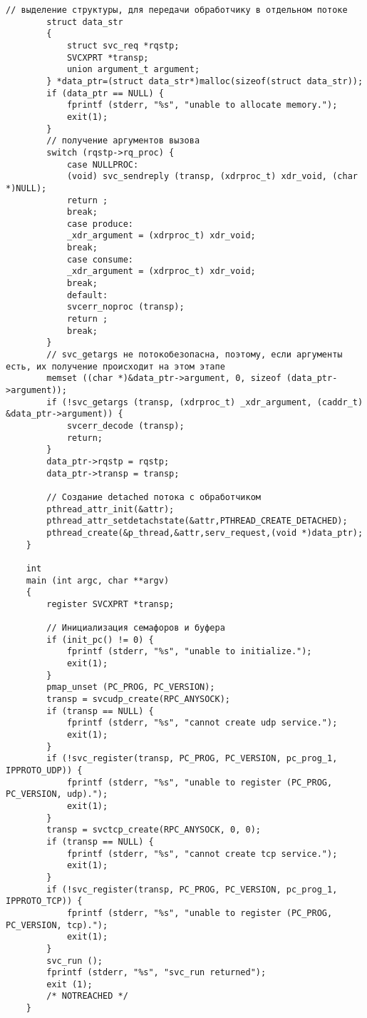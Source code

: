 \begin{lstlisting}[caption={<<Модифицированный файл pc\_svc.c с кодом многопоточного rpc сервер>>}]
		// выделение структуры, для передачи обработчику в отдельном потоке
		struct data_str
		{
			struct svc_req *rqstp;
			SVCXPRT *transp;
			union argument_t argument;
		} *data_ptr=(struct data_str*)malloc(sizeof(struct data_str));
		if (data_ptr == NULL) {
			fprintf (stderr, "%s", "unable to allocate memory.");
			exit(1);
		}
		// получение аргументов вызова
		switch (rqstp->rq_proc) {
			case NULLPROC:
			(void) svc_sendreply (transp, (xdrproc_t) xdr_void, (char *)NULL);
			return ;
			break;
			case produce:
			_xdr_argument = (xdrproc_t) xdr_void;
			break;
			case consume:
			_xdr_argument = (xdrproc_t) xdr_void;
			break;
			default:
			svcerr_noproc (transp);
			return ;
			break;
		}
		// svc_getargs не потокобезопасна, поэтому, если аргументы есть, их получение происходит на этом этапе
		memset ((char *)&data_ptr->argument, 0, sizeof (data_ptr->argument));
		if (!svc_getargs (transp, (xdrproc_t) _xdr_argument, (caddr_t) &data_ptr->argument)) {
			svcerr_decode (transp);
			return;
		}
		data_ptr->rqstp = rqstp;
		data_ptr->transp = transp;
		
		// Создание detached потока с обработчиком
		pthread_attr_init(&attr);
		pthread_attr_setdetachstate(&attr,PTHREAD_CREATE_DETACHED);
		pthread_create(&p_thread,&attr,serv_request,(void *)data_ptr);
	}
	
	int
	main (int argc, char **argv)
	{
		register SVCXPRT *transp;
		
		// Инициализация семафоров и буфера
		if (init_pc() != 0) {
			fprintf (stderr, "%s", "unable to initialize.");
			exit(1);
		}
		pmap_unset (PC_PROG, PC_VERSION);
		transp = svcudp_create(RPC_ANYSOCK);
		if (transp == NULL) {
			fprintf (stderr, "%s", "cannot create udp service.");
			exit(1);
		}
		if (!svc_register(transp, PC_PROG, PC_VERSION, pc_prog_1, IPPROTO_UDP)) {
			fprintf (stderr, "%s", "unable to register (PC_PROG, PC_VERSION, udp).");
			exit(1);
		}
		transp = svctcp_create(RPC_ANYSOCK, 0, 0);
		if (transp == NULL) {
			fprintf (stderr, "%s", "cannot create tcp service.");
			exit(1);
		}
		if (!svc_register(transp, PC_PROG, PC_VERSION, pc_prog_1, IPPROTO_TCP)) {
			fprintf (stderr, "%s", "unable to register (PC_PROG, PC_VERSION, tcp).");
			exit(1);
		}
		svc_run ();
		fprintf (stderr, "%s", "svc_run returned");
		exit (1);
		/* NOTREACHED */
	}
\end{lstlisting}

